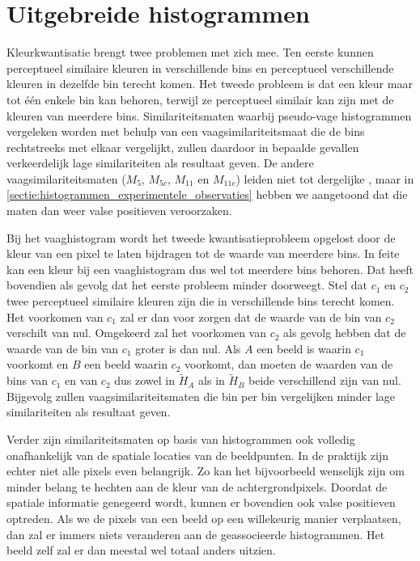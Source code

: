 \section{Uitgebreide histogrammen}

Kleurkwantisatie brengt twee problemen met zich mee. Ten eerste kunnen 
perceptueel similaire kleuren in verschillende bins en perceptueel 
verschillende kleuren in dezelfde bin terecht komen. Het tweede probleem is dat 
een kleur maar tot \'e\'en enkele bin kan behoren, terwijl ze perceptueel 
similair kan zijn met de kleuren van meerdere bins. Similariteitsmaten waarbij 
pseudo-vage histogrammen vergeleken worden met behulp van een 
vaagsimilariteitsmaat die de bins rechtstreeks met elkaar vergelijkt, zullen 
daardoor in bepaalde gevallen verkeerdelijk lage similariteiten als resultaat 
geven. De andere vaagsimilariteitsmaten ($M_5$, $M_{5c}$, $M_{11}$ en 
$M_{11c}$) leiden niet tot dergelijke , maar in 
\ref{sectie:histogrammen_experimentele_observaties} hebben we aangetoond dat 
die maten dan weer valse positieven veroorzaken.

Bij het vaaghistogram wordt het tweede kwantisatieprobleem opgelost
door de kleur van een pixel te laten bijdragen tot de waarde van meerdere bins. In feite kan een kleur
bij een vaaghistogram dus wel tot meerdere bins behoren. Dat heeft
bovendien als gevolg dat het eerste probleem minder doorweegt. Stel dat $c_1$ en $c_2$ twee perceptueel
similaire kleuren zijn die in verschillende bins terecht komen. Het
voorkomen van $c_1$ zal er dan voor zorgen dat de waarde van de bin van $c_2$ verschilt van nul.
Omgekeerd zal het voorkomen van $c_2$ als gevolg hebben dat de waarde van de bin van $c_1$ groter is
dan nul. Als $A$ een beeld is waarin $c_1$ voorkomt en $B$ een beeld waarin $c_2$ voorkomt, dan
moeten de waarden van de bins van $c_1$ en van $c_2$ dus zowel in $\widetilde{H}_A$ als in 
$\widetilde{H}_B$ beide verschillend zijn van nul. Bijgevolg zullen vaagsimilariteitsmaten
die bin per bin vergelijken minder lage similariteiten als resultaat geven.

Verder zijn similariteitsmaten op basis van histogrammen ook volledig onafhankelijk van de 
spatiale locaties van de beeldpunten. In
de praktijk zijn echter niet alle pixels even belangrijk. Zo kan het
bijvoorbeeld wenselijk zijn om minder belang te hechten aan de kleur van
de achtergrondpixels. Doordat de spatiale informatie genegeerd wordt,
kunnen er bovendien ook valse positieven optreden. Als we de pixels van een
beeld op een willekeurig manier verplaatsen, dan zal er immers niets veranderen aan
de geassocieerde histogrammen. Het beeld zelf zal er dan meestal wel totaal anders uitzien.  


